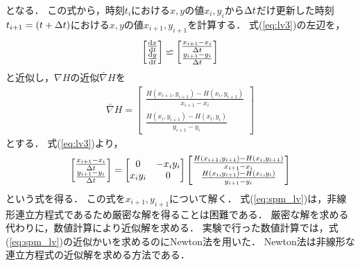となる． 
この式から，時刻$t_i$における$x,y$の値$x_i,y_i$から$\Delta t$だけ更新した時刻$t_{i+1} = (t + \Delta t)$における$x,y$の値$x_{i+1},y_{i+1}$を計算する．
式(\ref{eq:lv3})の左辺を，
\begin{align}
    \begin{bmatrix}
        \frac{\mathrm{d}x}{\mathrm{d}t} \\ 
        \frac{\mathrm{d}y}{\mathrm{d}t}
    \end{bmatrix}
     \backsimeq 
    \begin{bmatrix}
        \frac{x_{i+1} - x_i}{\Delta t} \\
         \frac{y_{i+1} - y_i}{\Delta t}
    \end{bmatrix}
\end{align}
と近似し，$\nabla H$の近似$\bar{\nabla}H$を
\begin{align}
    \bar{\nabla}H = 
    \begin{bmatrix}
        \frac{H(x_{i+1},y_{i+1}) - H(x_i,y_{i+1})}{x_{i+1} - x_i} \\
        \frac{H(x_{i},y_{i+1}) - H(x_i,y_i)}{y_{i+1} - y_i}
    \end{bmatrix}
\end{align}
とする．
式(\ref{eq:lv3})より，
\begin{align}
    \label{eq:spm_lv}
    \begin{bmatrix}
        \frac{x_{i+1} - x_i}{\Delta t} \\
         \frac{y_{i+1} - y_i}{\Delta t}
    \end{bmatrix}
    = 
    \begin{bmatrix}
        0 & -x_i y_i \\
        x_i y_i & 0
    \end{bmatrix}
    \begin{bmatrix}
        \frac{H(x_{i+1},y_{i+1}) - H(x_i,y_{i+1})}{x_{i+1} - x_i} \\
        \frac{H(x_{i},y_{i+1}) - H(x_i,y_i)}{y_{i+1} - y_i}
    \end{bmatrix}
\end{align}
という式を得る．
この式を$x_{i+1},y_{i+1}$について解く．
式(\ref{eq:spm_lv})は，非線形連立方程式であるため厳密な解を得ることは困難である．
厳密な解を求める代わりに，数値計算により近似解を求める．
実験で行った数値計算では，式(\ref{eq:spm_lv})の近似かいを求めるのにNewton法を用いた．
Newton法は非線形な連立方程式の近似解を求める方法である．

